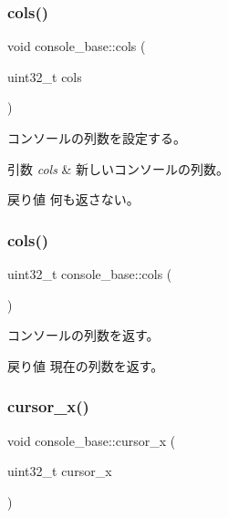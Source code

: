 \subsubsection{\texorpdfstring{cols()}{cols()}\hspace{0.1cm}{\footnotesize\ttfamily [1/2]}}
{\footnotesize\ttfamily void console\+\_\+base\+::cols (\begin{DoxyParamCaption}\item[{uint32\+\_\+t}]{cols }\end{DoxyParamCaption})}

コンソールの列数を設定する。 
\begin{DoxyParams}{引数}
{\em cols} & 新しいコンソールの列数。 \\
\hline
\end{DoxyParams}
\begin{DoxyReturn}{戻り値}
何も返さない。 
\end{DoxyReturn}
\hypertarget{classconsole__base_a9e9ea675def1c8df2defea7fb7d2c982}{}\label{classconsole__base_a9e9ea675def1c8df2defea7fb7d2c982} 
\subsubsection{\texorpdfstring{cols()}{cols()}\hspace{0.1cm}{\footnotesize\ttfamily [2/2]}}
{\footnotesize\ttfamily uint32\+\_\+t console\+\_\+base\+::cols (\begin{DoxyParamCaption}{ }\end{DoxyParamCaption})}

コンソールの列数を返す。 \begin{DoxyReturn}{戻り値}
現在の列数を返す。 
\end{DoxyReturn}
\hypertarget{classconsole__base_a9dce56c685c21f12ca54bb73e5dffcb4}{}\label{classconsole__base_a9dce56c685c21f12ca54bb73e5dffcb4} 
\subsubsection{\texorpdfstring{cursor\+\_\+x()}{cursor\_x()}\hspace{0.1cm}{\footnotesize\ttfamily [1/2]}}
{\footnotesize\ttfamily void console\+\_\+base\+::cursor\+\_\+x (\begin{DoxyParamCaption}\item[{uint32\+\_\+t}]{cursor\+\_\+x }\end{DoxyParamCaption})}


